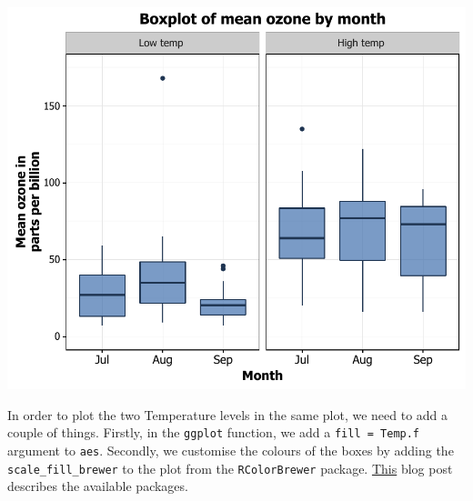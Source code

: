 \documentclass[]{article}
\begin{document}
\begin{center}\includegraphics{10_Boxplots_pdf/box_17-1} \end{center}

In order to plot the two Temperature levels in the same plot, we need to
add a couple of things. Firstly, in the \texttt{ggplot} function, we add
a \texttt{fill\ =\ Temp.f} argument to \texttt{aes}. Secondly, we
customise the colours of the boxes by adding the
\texttt{scale\_fill\_brewer} to the plot from the \texttt{RColorBrewer}
package.
\href{http://moderndata.plot.ly/create-colorful-graphs-in-r-with-rcolorbrewer-and-plotly/}{This}
blog post describes the available packages.
\end{document}
